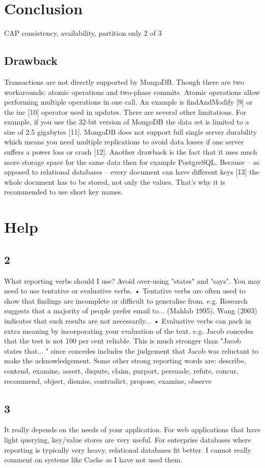 \documentclass[12pt,letter]{article}
\begin{document}
\section{Conclusion}
CAP consistency, availability, partition
only 2 of 3

\subsection{Drawback}
Transactions are not directly supported by MongoDB. Though there are two workarounds: atomic operations and two-phase commits. Atomic operations allow performing multiple operations in one call. An example is findAndModify [9] or the inc [10] operator used in updates.
There are several other limitations. For example, if you use the 32-bit version of MongoDB the data set is limited to a size of 2.5 gigabytes [11]. MongoDB does not support full single server durability which means you need multiple replications to avoid data losses if one server suffers a power loss or crash [12]. Another drawback is the fact that it uses much more storage space for the same data then for example PostgreSQL. Because – as opposed to relational databases – every document can have different keys [13] the whole document has to be stored, not only the values. That’s why it is recommended to use short key names.

\section*{Help}
\subsection*{2}
What reporting verbs should I use?
Avoid over-using "states" and "says". You may need to use tentative or evaluative verbs.
• Tentative verbs are often used to show that findings are incomplete or difficult to generalise from.
e.g. Research suggests that a majority of people prefer email to... (Mahlab 1995). Wang (2003) indicates that such results are not necessarily...
• Evaluative verbs can pack in extra meaning by incorporating your evaluation of the text. e.g. Jacob concedes that the test is not 100 per cent reliable.
This is much stronger than "Jacob states that... " since concedes includes the judgement that Jacob was reluctant to make the acknowledgement.
Some other strong reporting words are:
describe, contend, examine, assert, dispute, claim, purport, persuade, refute, concur, recommend, object, dismiss, contradict, propose, examine, observe

\subsection*{3}
It really depends on the needs of your application. For web applications that have light querying, key/value stores are very useful. For enterprise databases where reporting is typically very heavy, relational databases fit better. I cannot really comment on systems like Cache as I have not used them.


\end{document}
